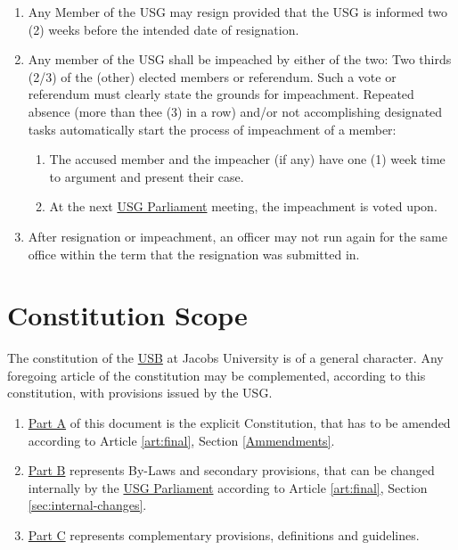 \documentclass[12pt]{LaTeX_Misc/constitution}
\begin{document}
\begin{enumerate}[label={\textbf{\S\arabic*}}]
\item  Any Member of the USG may resign provided that the USG is informed two (2) weeks before the intended date of resignation.

\item Any member of the USG shall be impeached by either of the two: Two thirds (2/3) of the (other) elected members or referendum. Such a vote or referendum must clearly state the grounds for impeachment. Repeated absence (more than thee (3) in a row) and/or not accomplishing designated tasks automatically start the process of impeachment of a member:
\begin{enumerate}
\item The accused member and the impeacher (if any) have one (1) week time to argument and present their case.
\item At the next \hyperref[USGParliamentDef]{USG Parliament}  meeting, the impeachment is voted upon.
\end{enumerate}

\item After resignation or impeachment, an officer may not run again for the same office within the term that the resignation was submitted in. 
\end{enumerate}



\label{art:final}

\section{Constitution Scope}
The constitution of the \hyperref[studentbody]{USB} at Jacobs University is of a general character. Any foregoing article of the constitution may be complemented, according to this constitution, with provisions issued by the USG.
\begin{enumerate}[label={\textbf{\S\arabic*}}]
\item \hyperref[PartA]{Part A} of this document is the explicit Constitution, that has to be amended according to Article \ref{art:final}, Section \ref{Ammendments}.

\item \hyperref[PartB]{Part B} represents By-Laws and secondary provisions, that can be changed internally by the \hyperref[USGParliamentDef]{USG Parliament} according to Article \ref{art:final}, Section \ref{sec:internal-changes}.

\item \hyperref[PartC]{Part C} represents complementary provisions, definitions and guidelines.

\end{enumerate}
\end{document}
